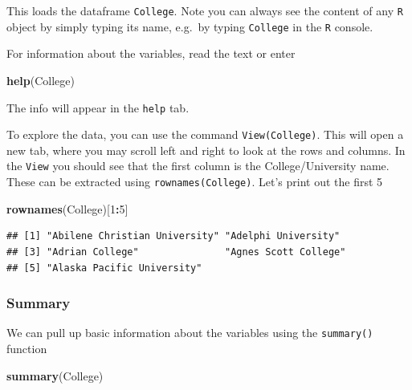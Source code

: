 \documentclass[]{article}
\newenvironment{Shaded}{\begin{snugshade}}{\end{snugshade}}
\newcommand{\KeywordTok}[1]{\textcolor[rgb]{0.13,0.29,0.53}{\textbf{#1}}}
\newcommand{\DecValTok}[1]{\textcolor[rgb]{0.00,0.00,0.81}{#1}}
\newcommand{\OperatorTok}[1]{\textcolor[rgb]{0.81,0.36,0.00}{\textbf{#1}}}
\newcommand{\NormalTok}[1]{#1}
\begin{document}
This loads the dataframe \texttt{College}. Note you can always see the
content of any \texttt{R} object by simply typing its name, e.g.~by
typing \texttt{College} in the \texttt{R} console.

For information about the variables, read the text or enter

\begin{Shaded}
\begin{Highlighting}[]
\KeywordTok{help}\NormalTok{(College)}
\end{Highlighting}
\end{Shaded}

The info will appear in the \texttt{help} tab.

To explore the data, you can use the command \texttt{View(College)}.
This will open a new tab, where you may scroll left and right to look at
the rows and columns. In the \texttt{View} you should see that the first
column is the College/University name. These can be extracted using
\texttt{rownames(College)}. Let's print out the first 5

\begin{Shaded}
\begin{Highlighting}[]
\KeywordTok{rownames}\NormalTok{(College)[}\DecValTok{1}\OperatorTok{:}\DecValTok{5}\NormalTok{]}
\end{Highlighting}
\end{Shaded}

\begin{verbatim}
## [1] "Abilene Christian University" "Adelphi University"          
## [3] "Adrian College"               "Agnes Scott College"         
## [5] "Alaska Pacific University"
\end{verbatim}

\subsubsection{Summary}\label{summary}

We can pull up basic information about the variables using the
\texttt{summary()} function

\begin{Shaded}
\begin{Highlighting}[]
\KeywordTok{summary}\NormalTok{(College)}
\end{Highlighting}
\end{Shaded}
\end{document}
